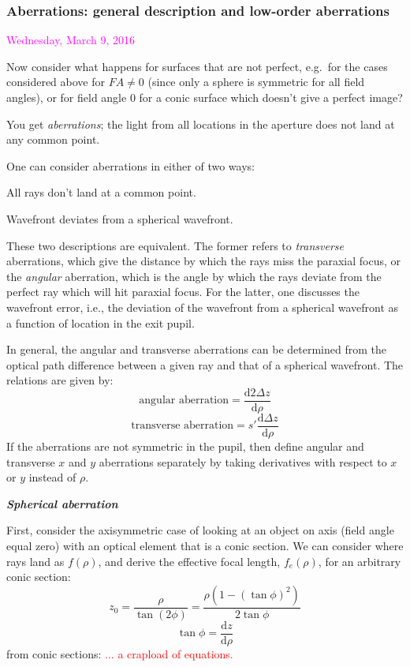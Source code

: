\documentclass[12pt]{article}
\begin{document}
\subsubsection*{Aberrations: general description and low-order aberrations}
\textcolor{magenta}{Wednesday, March 9, 2016}

Now consider what happens for surfaces that are not perfect, e.g.\ for
the cases considered above for $FA\neq 0$ (since only a sphere
is symmetric for all field angles), or for field angle 0 for a conic
surface which doesn't give a perfect image?

You get \emph{aberrations}; the light from all locations in the aperture
does not land at any common point.

One can consider aberrations in either of two ways:
\begin{itemize*}
    \item All rays don't land at a common point.
    \item Wavefront deviates from a spherical wavefront.
\end{itemize*}
These two descriptions are equivalent. The former refers to
\emph{transverse} aberrations, which give the distance by which the
rays miss the paraxial focus, or the \emph{angular} aberration, which is the
angle by which the rays deviate from the perfect ray which will hit
paraxial focus. For the latter, one discusses the wavefront error,
i.e., the deviation of the wavefront from a spherical wavefront as a
function of location in the exit pupil.

In general, the angular and transverse aberrations can be determined
from the optical path difference between a given ray and that of a
spherical wavefront. The relations are given by:
$$ \textrm{angular aberration}
= \frac{\textrm{d}2\Delta z}{\textrm{d}\rho}$$
$$ \textrm{transverse aberration}
= s'\frac{\textrm{d}\Delta z}{\textrm{d}\rho}$$
If the aberrations are not symmetric in the pupil, then
define angular and transverse $x$ and $y$ aberrations separately by taking
derivatives with respect to $x$ or $y$ instead of $\rho$.

\textbf{\emph{Spherical aberration}}

First, consider the axisymmetric case of looking at an object on axis
(field angle equal zero) with an optical element that is a conic
section. We can consider where rays land as $f(\rho)$, and derive
the effective focal length, $f_e(\rho)$, for an arbitrary conic
section:
$$ z_0 = \frac{\rho}{\tan(2\phi)} = \frac{\rho(1-(\tan\phi)^2)}{2\tan\phi}$$
$$ \tan\phi = \frac{\textrm{d}z}{\textrm{d}\rho} $$
from conic sections: \textcolor{red}{$\ldots$ a crapload of equations.}
\end{document}
